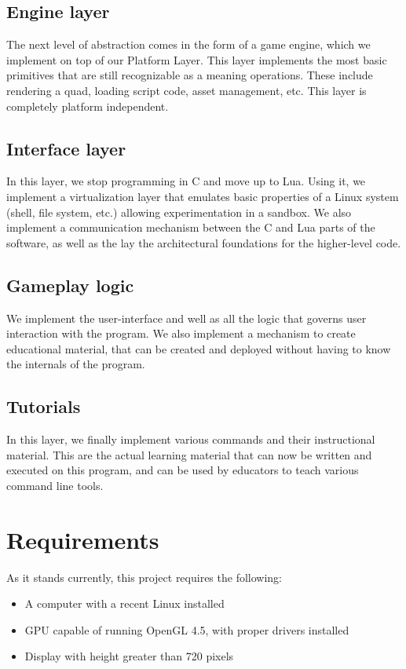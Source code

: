 \documentclass[a4paper]{article}
\begin{document}
\subsection{Engine layer}
The next level of abstraction comes in the form of a game engine, which we implement on top of our Platform Layer. This layer implements the most basic primitives that are still recognizable as a meaning operations. These include rendering a quad, loading script code, asset management, etc. This layer is completely platform independent.

\subsection{Interface layer}
In this layer, we stop programming in C and move up to Lua. Using it, we implement a virtualization layer that emulates basic properties of a Linux system (shell, file system, etc.) allowing experimentation in a sandbox. We also implement a communication mechanism between the C and Lua parts of the software, as well as the lay the architectural foundations for the higher-level code.

\subsection{Gameplay logic}
We implement the user-interface and well as all the logic that governs user interaction with the program. We also implement a mechanism to create educational material, that can be created and deployed without having to know the internals of the program.

\subsection{Tutorials}
In this layer, we finally implement various commands and their instructional material. This are the actual learning material that can now be written and executed on this program, and can be used by educators to teach various command line tools.

\section{Requirements}
As it stands currently, this project requires the following:
\begin{itemize}
    \item A computer with a recent Linux installed
    \item GPU capable of running OpenGL 4.5, with proper drivers installed
    \item Display with height greater than 720 pixels
\end{itemize}
\end{document}
